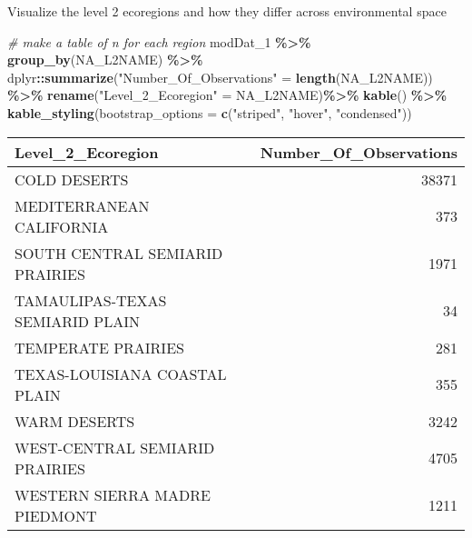 \documentclass[
]{article}
\newenvironment{Shaded}{\begin{snugshade}}{\end{snugshade}}
\newcommand{\AttributeTok}[1]{\textcolor[rgb]{0.13,0.29,0.53}{#1}}
\newcommand{\CommentTok}[1]{\textcolor[rgb]{0.56,0.35,0.01}{\textit{#1}}}
\newcommand{\FunctionTok}[1]{\textcolor[rgb]{0.13,0.29,0.53}{\textbf{#1}}}
\newcommand{\NormalTok}[1]{#1}
\newcommand{\OtherTok}[1]{\textcolor[rgb]{0.56,0.35,0.01}{#1}}
\newcommand{\SpecialCharTok}[1]{\textcolor[rgb]{0.81,0.36,0.00}{\textbf{#1}}}
\newcommand{\StringTok}[1]{\textcolor[rgb]{0.31,0.60,0.02}{#1}}
\begin{document}
Visualize the level 2 ecoregions and how they differ across
environmental space

\begin{Shaded}
\begin{Highlighting}[]
\CommentTok{\# make a table of n for each region}
\NormalTok{modDat\_1 }\SpecialCharTok{\%\textgreater{}\%} 
  \FunctionTok{group\_by}\NormalTok{(NA\_L2NAME) }\SpecialCharTok{\%\textgreater{}\%} 
\NormalTok{  dplyr}\SpecialCharTok{::}\FunctionTok{summarize}\NormalTok{(}\StringTok{"Number\_Of\_Observations"} \OtherTok{=} \FunctionTok{length}\NormalTok{(NA\_L2NAME)) }\SpecialCharTok{\%\textgreater{}\%} 
  \FunctionTok{rename}\NormalTok{(}\StringTok{"Level\_2\_Ecoregion"} \OtherTok{=}\NormalTok{ NA\_L2NAME)}\SpecialCharTok{\%\textgreater{}\%} 
  \FunctionTok{kable}\NormalTok{() }\SpecialCharTok{\%\textgreater{}\%}
\FunctionTok{kable\_styling}\NormalTok{(}\AttributeTok{bootstrap\_options =} \FunctionTok{c}\NormalTok{(}\StringTok{"striped"}\NormalTok{, }\StringTok{"hover"}\NormalTok{, }\StringTok{"condensed"}\NormalTok{)) }
\end{Highlighting}
\end{Shaded}

\begin{longtable}[t]{lr}
\toprule
Level\_2\_Ecoregion & Number\_Of\_Observations\\
\midrule
COLD DESERTS & 38371\\
MEDITERRANEAN CALIFORNIA & 373\\
SOUTH CENTRAL SEMIARID PRAIRIES & 1971\\
TAMAULIPAS-TEXAS SEMIARID PLAIN & 34\\
TEMPERATE PRAIRIES & 281\\
\addlinespace
TEXAS-LOUISIANA COASTAL PLAIN & 355\\
WARM DESERTS & 3242\\
WEST-CENTRAL SEMIARID PRAIRIES & 4705\\
WESTERN SIERRA MADRE PIEDMONT & 1211\\
\bottomrule
\end{longtable}
\end{document}
